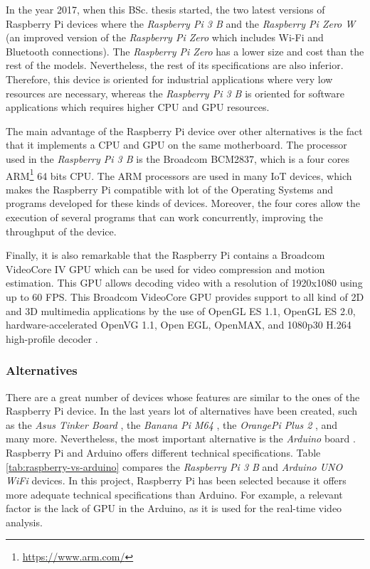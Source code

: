 In the year 2017, when this \ac{BSc.} thesis started, the two latest versions of Raspberry Pi devices where the \textit{Raspberry Pi 3 B} and the \textit{Raspberry Pi Zero W} (an improved version of the \textit{Raspberry Pi Zero} which includes Wi-Fi and Bluetooth connections). The \textit{Raspberry Pi Zero} has a lower size and cost than the rest of the models. Nevertheless, the rest of its specifications are also inferior. Therefore, this device is oriented for industrial applications where very low resources are necessary, whereas the \textit{Raspberry Pi 3 B} is oriented for software applications which requires higher CPU and GPU resources.

The main advantage of the Raspberry Pi device over other alternatives is the fact that it implements a \ac{CPU} and \ac{GPU} on the same motherboard. The processor used in the \textit{Raspberry Pi 3 B} is the Broadcom BCM2837, which is a four cores ARM\footnote{\url{https://www.arm.com/}} 64 bits \ac{CPU}. The ARM processors are used in many \ac{IoT} devices, which makes the Raspberry Pi compatible with lot of the Operating Systems and programs developed for these kinds of devices. Moreover, the four cores allow the execution of several programs that can work concurrently, improving the throughput of the device.

Finally, it is also remarkable that the Raspberry Pi contains a Broadcom VideoCore IV \ac{GPU} which can be used for video compression and motion estimation. This \ac{GPU} allows decoding video with a resolution of 1920x1080 using up to 60 \ac{FPS}. This Broadcom VideoCore \ac{GPU} provides support to all kind of 2D and 3D multimedia applications by the use of OpenGL ES 1.1, OpenGL ES 2.0, hardware-accelerated OpenVG 1.1, Open EGL, OpenMAX, and 1080p30 H.264 high-profile decoder \cite{VideoCoreIV}.


\subsubsection{Alternatives}
There are a great number of devices whose features are similar to the ones of the Raspberry Pi device. In the last years lot of alternatives have been created, such as the \textit{Asus Tinker Board} \cite{Tinker}, the \textit{Banana Pi M64} \cite{M64}, the \textit{OrangePi Plus 2} \cite{OrangePi}, and many more. Nevertheless, the most important alternative is the \textit{Arduino} board \cite{Arduino}. Raspberry Pi and Arduino offers different technical specifications. Table \ref{tab:raspberry-vs-arduino} compares the \textit{Raspberry Pi 3 B} and \textit{Arduino UNO WiFi} devices. In this project, Raspberry Pi has been selected because it offers more adequate technical specifications than Arduino. For example, a relevant factor is the lack of \ac{GPU} in the Arduino, as it is used for the real-time video analysis.

